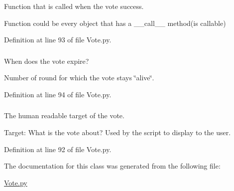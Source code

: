 Function that is called when the vote success. 

Function could be every object that has a \_\-\_\-call\_\-\_\- method(is callable) 

Definition at line 93 of file Vote.py.

\hypertarget{class_vote_1_1_vote_af6004cd9228253e93b618b769dbc8855}{
\subsubsection[{aliveRounds}]{}}
\label{class_vote_1_1_vote_af6004cd9228253e93b618b769dbc8855}


When does the vote expire? 

Number of round for which the vote stays \char`\"{}alive\char`\"{}. 

Definition at line 94 of file Vote.py.

\hypertarget{class_vote_1_1_vote_afe0be7a3c2d7d0439a478b1ef0b30ed6}{
\subsubsection[{target}]{}}
\label{class_vote_1_1_vote_afe0be7a3c2d7d0439a478b1ef0b30ed6}


The human readable target of the vote. 

Target: What is the vote about? Used by the script to display to the user. 

Definition at line 92 of file Vote.py.



The documentation for this class was generated from the following file:\begin{DoxyCompactItemize}
\item 
\hyperlink{_vote_8py}{Vote.py}\end{DoxyCompactItemize}

